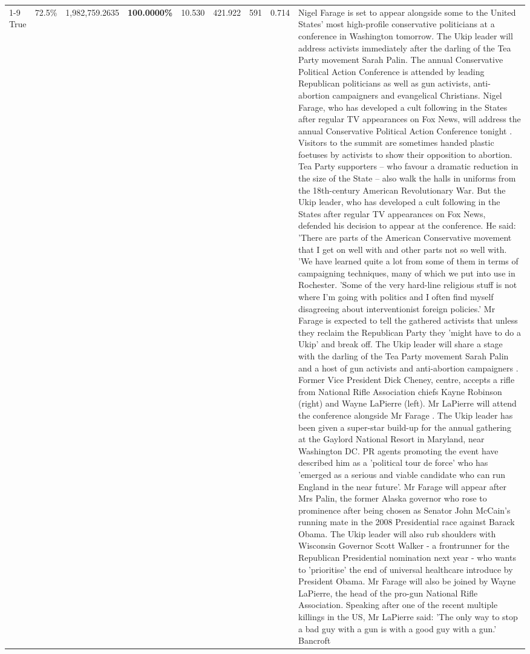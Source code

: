 \begin{table}[H]
\begin{tabular}{lllrlllll}
\cline{1-9}
True & 72.5\% & 1,982,759.2635 & \bfseries \color{red} 100.0000\% & 10.530 & 421.922 & 591 & 0.714 & Nigel Farage is set to appear alongside some to the United States' most high-profile conservative politicians at a conference in Washington tomorrow. The Ukip leader will address activists immediately after the darling of the Tea Party movement Sarah Palin. The annual Conservative Political Action Conference is attended by leading Republican politicians as well as gun activists, anti-abortion campaigners and evangelical Christians. Nigel Farage, who has developed a cult following in the States after regular TV appearances on Fox News, will address the annual Conservative Political Action Conference tonight . Visitors to the summit are sometimes handed plastic foetuses by activists to show their opposition to abortion. Tea Party supporters – who favour a dramatic reduction in the size of the State – also walk the halls in uniforms from the 18th-century American Revolutionary War. But the Ukip leader, who has developed a cult following in the States after regular TV appearances on Fox News, defended his decision to appear at the conference. He said: 'There are parts of the American Conservative movement that I get on well with and other parts not so well with. 'We have learned quite a lot from some of them in terms of campaigning techniques, many of which we put into use in Rochester. 'Some of the very hard-line religious stuff is not where I'm going with politics and I often find myself disagreeing about interventionist foreign policies.' Mr Farage is expected to tell the gathered activists that unless they reclaim the Republican Party they 'might have to do a Ukip' and break off. The Ukip leader will share a stage with the darling of the Tea Party movement Sarah Palin and a host of gun activists and anti-abortion campaigners . Former Vice President Dick Cheney, centre, accepts a rifle from National Rifle Association chiefs Kayne Robinson (right) and Wayne LaPierre (left). Mr LaPierre will attend the conference alongside Mr Farage . The Ukip leader has been given a super-star build-up for the annual gathering at the Gaylord National Resort in Maryland, near Washington DC. PR agents promoting the event have described him as a 'political tour de force' who has 'emerged as a serious and viable candidate who can run England in the near future'. Mr Farage will appear after Mrs Palin, the former Alaska governor who rose to prominence after being chosen as Senator John McCain's running mate in the 2008 Presidential race against Barack Obama. The Ukip leader will also rub shoulders with Wisconsin Governor Scott Walker - a frontrunner for the Republican Presidential nomination next year - who wants to 'prioritise' the end of universal healthcare introduce by President Obama. Mr Farage will also be joined by Wayne LaPierre, the head of the pro-gun National Rifle Association. Speaking after one of the recent multiple killings in the US, Mr LaPierre said: 'The only way to stop a bad guy with a gun is with a good guy with a gun.' Bancroft \\

\end{tabular}
\end{table}
